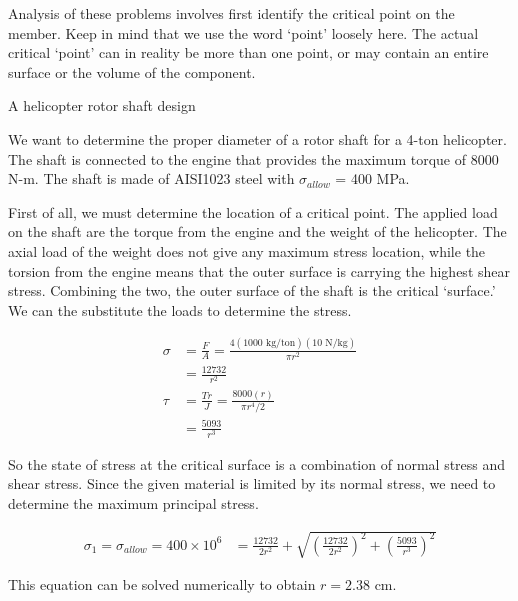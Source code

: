 \documentclass[
10pt,
a4paper,
openany,
svgnames,
]{book} %
\begin{document}
Analysis of these problems involves first identify the critical point on the member. Keep in mind that we use the word `point' loosely here. The actual critical `point' can in reality be more than one point, or may contain an entire surface or the volume of the component.

\begin{example} A helicopter rotor shaft design

  We want to determine the proper diameter of a rotor shaft for a 4-ton helicopter. The shaft is connected to the engine that provides the maximum torque of 8000 N-m. The shaft is made of AISI1023 steel with $\sigma_{allow}$ = 400 MPa.

  \begin{figure}[H]
    \centering
  \end{figure}

\end{example}
\begin{solution}
  First of all, we must determine the location of a critical point. The applied load on the shaft are the torque from the engine and the weight of the helicopter. The axial load of the weight does not give any maximum stress location, while the torsion from the engine means that the outer surface is carrying the highest shear stress. Combining the two, the outer surface of the shaft is the critical `surface.' We can the substitute the loads to determine the stress.

  \begin{align*}
    \sigma &= \frac{F}{A} = \frac{4(1000 \text{ kg/ton})(10 \text{ N/kg})}{\pi r^2} \\
           &= \frac{12732}{r^2} \\
    \tau &= \frac{Tr}{J} = \frac{8000(r)}{\pi r^4/2} \\
           &= \frac{5093}{r^3}
  \end{align*}

  So the state of stress at the critical surface is a combination of normal stress and shear stress. Since the given material is limited by its normal stress, we need to determine the maximum principal stress.

  \begin{align*}
    \sigma_1 = \sigma_{allow} = 400 \times 10^6 &= \frac{12732}{2r^2} + \sqrt{ \left( \frac{12732}{2r^2} \right)^2 + \left( \frac{5093}{r^3} \right)^2 }
  \end{align*}

  This equation can be solved numerically to obtain $r = 2.38$ cm.
\end{solution}
\end{document}
